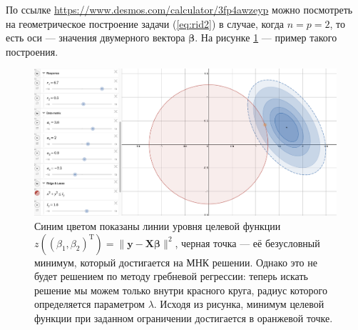 \documentclass[12pt,a4paper,final]{article}
\newcommand{\betaa}{\bm{\beta}}
\newcommand{\X}{\bm{X}}
\newcommand{\1}{\mathds{1}}
\begin{document}
По ссылке \url{https://www.desmos.com/calculator/3fp4awzeyp}
можно посмотреть на геометрическое построение задачи (\ref{eq:rid2}) в случае, когда $n = p = 2$, то есть оси --- значения двумерного вектора $\betaa$. На рисунке \ref{fig:rid_des} --- пример такого построения.
\begin{figure}[]
\centering
\includegraphics[width=1\textwidth]{ridge3.png}
\caption{Синим цветом показаны линии уровня целевой функции $ z((\beta_1,\beta_2)^\mathrm{T}) = \|\bm y - \X \betaa\|^2$, черная точка --- её безусловный минимум, который достигается на МНК решении. Однако это не будет решением по методу гребневой регрессии: теперь искать решение мы можем только внутри красного круга, радиус которого определяется параметром $\lambda$. Исходя из рисунка, минимум целевой функции при заданном ограничении достигается в оранжевой точке.}
\label{fig:rid_des}
\end{figure}
\end{document}
